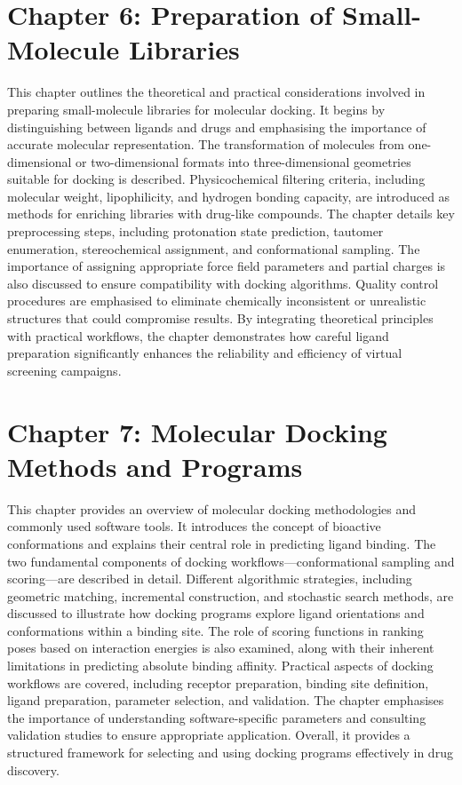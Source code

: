 \documentclass[12pt,a4paper]{article}
\begin{document}
\section*{Chapter 6: Preparation of Small-Molecule Libraries}
This chapter outlines the theoretical and practical considerations involved in preparing small-molecule libraries for molecular docking. It begins by distinguishing between ligands and drugs and emphasising the importance of accurate molecular representation. The transformation of molecules from one-dimensional or two-dimensional formats into three-dimensional geometries suitable for docking is described. Physicochemical filtering criteria, including molecular weight, lipophilicity, and hydrogen bonding capacity, are introduced as methods for enriching libraries with drug-like compounds. The chapter details key preprocessing steps, including protonation state prediction, tautomer enumeration, stereochemical assignment, and conformational sampling. The importance of assigning appropriate force field parameters and partial charges is also discussed to ensure compatibility with docking algorithms. Quality control procedures are emphasised to eliminate chemically inconsistent or unrealistic structures that could compromise results. By integrating theoretical principles with practical workflows, the chapter demonstrates how careful ligand preparation significantly enhances the reliability and efficiency of virtual screening campaigns.

\section*{Chapter 7: Molecular Docking Methods and Programs}
This chapter provides an overview of molecular docking methodologies and commonly used software tools. It introduces the concept of bioactive conformations and explains their central role in predicting ligand binding. The two fundamental components of docking workflows—conformational sampling and scoring—are described in detail. Different algorithmic strategies, including geometric matching, incremental construction, and stochastic search methods, are discussed to illustrate how docking programs explore ligand orientations and conformations within a binding site. The role of scoring functions in ranking poses based on interaction energies is also examined, along with their inherent limitations in predicting absolute binding affinity. Practical aspects of docking workflows are covered, including receptor preparation, binding site definition, ligand preparation, parameter selection, and validation. The chapter emphasises the importance of understanding software-specific parameters and consulting validation studies to ensure appropriate application. Overall, it provides a structured framework for selecting and using docking programs effectively in drug discovery.
\end{document}

